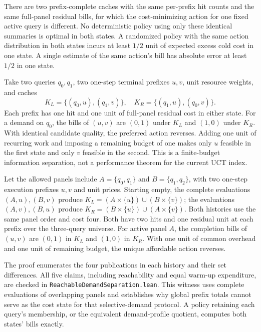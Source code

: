 \begin{proposition}
\label{prop:graph-separation}
There are two prefix-complete caches with the same per-prefix hit counts and the same full-panel residual bills, for which the cost-minimizing action for one fixed active query is different. No deterministic policy using only these identical summaries is optimal in both states. A randomized policy with the same action distribution in both states incurs at least $1/2$ unit of expected excess cold cost in one state. A single estimate of the same action's bill has absolute error at least $1/2$ in one state.
\end{proposition}
Take two queries $q_0,q_1$, two one-step terminal prefixes $u,v$, unit resource weights, and caches
\[
 K_L=\{(q_0,u),(q_1,v)\},\quad
 K_R=\{(q_1,u),(q_0,v)\}.
\]
Each prefix has one hit and one unit of full-panel residual cost in either state. For a demand on $q_0$, the bills of $(u,v)$ are $(0,1)$ under $K_L$ and $(1,0)$ under $K_R$. With identical candidate quality, the preferred action reverses. Adding one unit of recurring work and imposing a remaining budget of one makes only $u$ feasible in the first state and only $v$ feasible in the second. This is a finite-budget information separation, not a performance theorem for the current UCT index.

\begin{proposition}
\label{prop:reachable-separation}
Let the allowed panels include $A=\{q_0,q_1\}$ and $B=\{q_1,q_2\}$,
with two one-step execution prefixes $u,v$ and unit prices.
Starting empty, the complete evaluations $(A,u),(B,v)$ produce
$K_L=(A\times\{u\})\cup(B\times\{v\})$; the evaluations
$(A,v),(B,u)$ produce $K_R=(B\times\{u\})\cup(A\times\{v\})$.
Both histories use the same panel order and cost four. Both have two hits and one residual unit at each
prefix over the three-query universe. For active panel $A$, the completion
bills of $(u,v)$ are $(0,1)$ in $K_L$ and $(1,0)$ in $K_R$.
With one unit of common overhead and one unit of remaining budget, the unique
affordable action reverses.
\end{proposition}
The proof enumerates the four publications in each history and their set
differences. All five claims, including reachability and equal warm-up expenditure,
are checked in \texttt{ReachableDemandSeparation.lean}. This witness uses
complete evaluations of overlapping panels and establishes why global prefix
totals cannot serve as the cost state for that selective-demand protocol.
A policy retaining each query's membership, or the equivalent demand-profile
quotient, computes both states' bills exactly.

